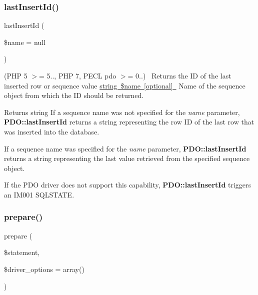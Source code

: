 \subsubsection{\texorpdfstring{last\+Insert\+Id()}{lastInsertId()}}
{\footnotesize\ttfamily last\+Insert\+Id (\begin{DoxyParamCaption}\item[{}]{\$name = {\ttfamily null} }\end{DoxyParamCaption})}

(P\+HP 5 $>$= 5.., P\+HP 7, P\+E\+CL pdo $>$= 0..)~\newline
 Returns the ID of the last inserted row or sequence value \mbox{\hyperlink{}{string \$name \mbox{[}optional\mbox{]} }} Name of the sequence object from which the ID should be returned. 

\begin{DoxyReturn}{Returns}
string If a sequence name was not specified for the {\itshape name} parameter, {\bfseries P\+D\+O\+::last\+Insert\+Id} returns a string representing the row ID of the last row that was inserted into the database. 
\end{DoxyReturn}


If a sequence name was specified for the {\itshape name} parameter, {\bfseries P\+D\+O\+::last\+Insert\+Id} returns a string representing the last value retrieved from the specified sequence object. 

If the P\+DO driver does not support this capability, {\bfseries P\+D\+O\+::last\+Insert\+Id} triggers an I\+M001 S\+Q\+L\+S\+T\+A\+TE. \mbox{\label{interface_pes_1_1_database_1_1_handler_1_1_p_d_o_interface_af212c3950522906fe864096a27c24156}} 
\subsubsection{\texorpdfstring{prepare()}{prepare()}}
{\footnotesize\ttfamily prepare (\begin{DoxyParamCaption}\item[{}]{\$statement,  }\item[{}]{\$driver\+\_\+options = {\ttfamily array()} }\end{DoxyParamCaption})}

